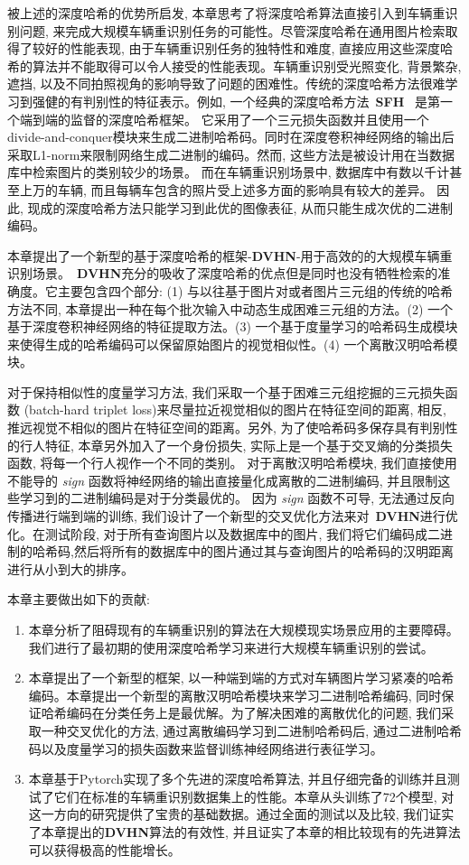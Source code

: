 被上述的深度哈希的优势所启发, 本章思考了将深度哈希算法直接引入到车辆重识别问题, 来完成大规模车辆重识别任务的可能性。尽管深度哈希在通用图片检索取得了较好的性能表现, 由于车辆重识别任务的独特性和难度, 直接应用这些深度哈希的算法并不能取得可以令人接受的性能表现。车辆重识别受光照变化, 背景繁杂, 遮挡, 以及不同拍照视角的影响导致了问题的困难性。传统的深度哈希方法很难学习到强健的有判别性的特征表示。例如, 一个经典的深度哈希方法~\textbf{SFH}~\cite{lai2015simultaneous} 是第一个端到端的监督的深度哈希框架。 它采用了一个三元损失函数并且使用一个divide-and-conquer模块来生成二进制哈希码。同时在深度卷积神经网络的输出后采取L1-norm来限制网络生成二进制的编码。然而, 这些方法是被设计用在当数据库中检索图片的类别较少的场景。 而在车辆重识别场景中, 数据库中有数以千计甚至上万的车辆, 而且每辆车包含的照片受上述多方面的影响具有较大的差异。 因此, 现成的深度哈希方法只能学习到此优的图像表征, 从而只能生成次优的二进制编码。\par
本章提出了一个新型的基于深度哈希的框架-\textbf{DVHN}-用于高效的的大规模车辆重识别场景。~\textbf{DVHN}充分的吸收了深度哈希的优点但是同时也没有牺牲检索的准确度。它主要包含四个部分: (1) 与以往基于图片对或者图片三元组的传统的哈希方法不同, 本章提出一种在每个批次输入中动态生成困难三元组的方法。(2) 一个基于深度卷积神经网络的特征提取方法。(3) 一个基于度量学习的哈希码生成模块来使得生成的哈希编码可以保留原始图片的视觉相似性。(4) 一个离散汉明哈希模块。 \par
对于保持相似性的度量学习方法, 我们采取一个基于困难三元组挖掘的三元损失函数 (batch-hard triplet loss)来尽量拉近视觉相似的图片在特征空间的距离, 相反, 推远视觉不相似的图片在特征空间的距离。另外, 为了使哈希码多保存具有判别性的行人特征, 本章另外加入了一个身份损失, 实际上是一个基于交叉熵的分类损失函数, 将每一个行人视作一个不同的类别。 对于离散汉明哈希模块, 我们直接使用不能导的 \textit{sign} 函数将神经网络的输出直接量化成离散的二进制编码, 并且限制这些学习到的二进制编码是对于分类最优的。 因为 \textit{sign} 函数不可导, 无法通过反向传播进行端到端的训练, 我们设计了一个新型的交叉优化方法来对~\textbf{DVHN}进行优化。在测试阶段, 对于所有查询图片以及数据库中的图片, 我们将它们编码成二进制的哈希码,然后将所有的数据库中的图片通过其与查询图片的哈希码的汉明距离进行从小到大的排序。 \par
本章主要做出如下的贡献:
\begin{enumerate}
    \item 本章分析了阻碍现有的车辆重识别的算法在大规模现实场景应用的主要障碍。我们进行了最初期的使用深度哈希学习来进行大规模车辆重识别的尝试。
    \item 本章提出了一个新型的框架, 以一种端到端的方式对车辆图片学习紧凑的哈希编码。本章提出一个新型的离散汉明哈希模块来学习二进制哈希编码, 同时保证哈希编码在分类任务上是最优解。为了解决困难的离散优化的问题, 我们采取一种交叉优化的方法, 通过离散编码学习到二进制哈希码后, 通过二进制哈希码以及度量学习的损失函数来监督训练神经网络进行表征学习。
    \item 本章基于Pytorch实现了多个先进的深度哈希算法, 并且仔细完备的训练并且测试了它们在标准的车辆重识别数据集上的性能。本章从头训练了72个模型, 对这一方向的研究提供了宝贵的基础数据。通过全面的测试以及比较, 我们证实了本章提出的\textbf{DVHN}算法的有效性, 并且证实了本章的相比较现有的先进算法可以获得极高的性能增长。
\end{enumerate}

